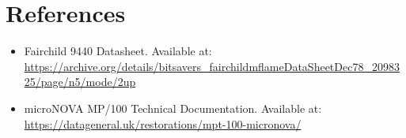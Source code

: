 \documentclass[a4paper,12pt]{article}
\begin{document}
\section*{References}

\begin{itemize}
    \item Fairchild 9440 Datasheet. Available at: \url{https://archive.org/details/bitsavers_fairchildmflameDataSheetDec78_2098325/page/n5/mode/2up}
    \item microNOVA MP/100 Technical Documentation. Available at: \url{https://datageneral.uk/restorations/mpt-100-micronova/}
\end{itemize}
\end{document}
